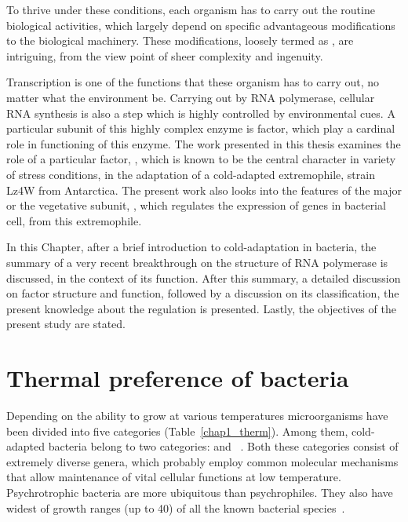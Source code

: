 To thrive under these conditions, each organism has to carry out
the routine biological activities, which largely depend on
specific advantageous modifications to the biological machinery.
These modifications, loosely termed as , are
intriguing, from the view point of sheer complexity and ingenuity.

Transcription is one of the functions that these organism has to
carry out, no matter what the environment be. Carrying out by RNA
polymerase, cellular RNA synthesis is also a step which is highly
controlled by environmental cues. A particular subunit of this
highly complex enzyme is \s{} factor, which play a cardinal role
in functioning of this enzyme. The work presented in this thesis
examines the role of a particular \s{} factor, \sigs{}, which is
known to be the central character in variety of stress conditions,
in the adaptation of a cold-adapted extremophile,  strain Lz4W from Antarctica. The present work also looks
into the features of the major or the vegetative \s{} subunit,
\s{}, which regulates the expression of 
genes in bacterial cell, from this extremophile.

In this Chapter, after a brief introduction to cold-adaptation in
bacteria, the summary of a very recent breakthrough on the
structure of RNA polymerase is discussed, in the context of its
function. After this summary, a detailed discussion on \s{} factor
structure and function, followed by a discussion on its
classification, the present knowledge about the \sigs{} regulation
is presented. Lastly, the objectives of the present study are
stated.


\section{Thermal preference of bacteria}

Depending on the ability to grow at various temperatures
microorganisms have been divided into five categories
(Table~\ref{chap1_therm}). Among them, cold-adapted bacteria
belong to two categories:  and
~\citep{Morita1975}. Both these categories
consist of extremely diverse genera, which probably employ common
molecular mechanisms that allow maintenance of vital cellular
functions at low temperature. Psychrotrophic bacteria are more
ubiquitous than psychrophiles. They also have widest of growth
ranges (up to 40\dg{}) of all the known bacterial
species~\citep{Hebraud1999}.

